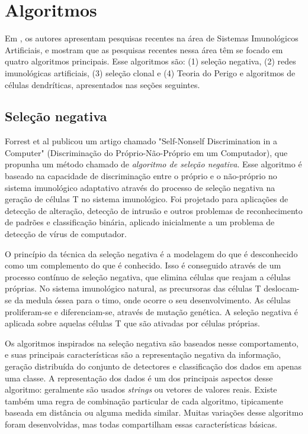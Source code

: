 \section{Algoritmos}

Em \citet{Dasgupta2010}, os autores apresentam pesquisas recentes na área de Sistemas Imunológicos Artificiais, e mostram que as pesquisas recentes nessa área têm se focado em quatro algoritmos principais. Esse algoritmos são: (1) seleção negativa, (2) redes imunológicas artificiais, (3) seleção clonal e (4) Teoria do Perigo e algoritmos de células dendríticas, apresentados nas seções seguintes.

\subsection{Seleção negativa}

Forrest et al \cite{Forrest1994} publicou um artigo chamado "Self-Nonself Discrimination in a Computer" (Discriminação do Próprio-Não-Próprio em um Computador), que propunha um método chamado de \emph{algoritmo de seleção negativa}. Esse algoritmo é baseado na capacidade de discriminação entre o próprio e o não-próprio no sistema imunológico adaptativo através do processo de seleção negativa na geração de células T no sistema imunológico. Foi projetado para aplicações de detecção de alteração, detecção de intrusão e outros problemas de reconhecimento de padrões e classificação binária, aplicado inicialmente a um problema de detecção de vírus de computador.

O princípio da técnica da seleção negativa é a modelagem do que é desconhecido como um complemento do que é conhecido. Isso é conseguido através de um processo contínuo de seleção negativa, que elimina células que reajam a células próprias. No sistema imunológico natural, as precursoras das células T deslocam-se da medula óssea para o timo, onde ocorre o seu desenvolvimento. As células proliferam-se e diferenciam-se, através de mutação genética. A seleção negativa é aplicada sobre aquelas células T que são ativadas por células próprias.

Os algoritmos inspirados na seleção negativa são baseados nesse comportamento, e suas principais características são a representação negativa da informação, geração distribuída do conjunto de detectores e classificação dos dados em apenas uma classe. A representação dos dados é um dos principais aspectos desse algoritmo: geralmente são usados \emph{strings} ou vetores de valores reais. Existe também uma regra de combinação particular de cada algoritmo, tipicamente baseada em distância ou alguma medida similar. Muitas variações desse algoritmo foram desenvolvidas, mas todas compartilham essas características básicas.

